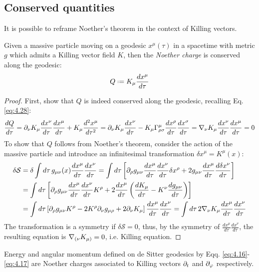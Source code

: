 \subsection{Conserved quantities}

It is possible to reframe Noether's theorem in the context of Killing vectors.

\begin{theorem}[Noether]
  Given a massive particle moving on a geodesic $ x^\mu(\tau) $ in a spacetime with metric $ g $ which admits a Killing vector field $ K $, then the \textit{Noether charge} is conserved along the geodesic:
  \begin{equation}
    Q \defeq K_\mu \frac{dx^\mu}{d\tau}
    \label{eq:4.29}
  \end{equation}
\end{theorem}
\begin{proof}
  First, show that $ Q $ is indeed conserved along the geodesic, recalling Eq. \ref{eq:4.28}:
  \begin{equation*}
    \frac{dQ}{d\tau} = \partial_\nu K_\mu \frac{dx^\nu}{d\tau} \frac{dx^\mu}{d\tau} + K_\mu \frac{d^2 x^\mu}{d\tau^2} = \partial_\nu K_\mu \frac{dx^\nu}{d\tau} - K_\mu \Gamma^\mu_{\rho \sigma} \frac{dx^\rho}{d\tau} \frac{dx^\sigma}{d\tau} = \nabla_\nu K_\mu \frac{dx^\nu}{d\tau} \frac{dx^\mu}{d\tau} = 0
  \end{equation*}
  To show that $ Q $ follows from Noether's theorem, consider the action of the massive particle and introduce an infinitesimal transformation $ \delta x^\mu = K^\mu (x) $:
  \begin{equation*}
    \begin{split}
      \delta \mathcal{S}
      &= \delta \int d\tau\, g_{\mu \nu}(x) \frac{dx^\mu}{d\tau} \frac{dx^\nu}{d\tau} = \int d\tau \left[ \partial_\rho g_{\mu \nu} \frac{dx^\mu}{d\tau} \frac{dx^\nu}{d\tau} \delta x^\rho + 2 g_{\mu \nu} \frac{dx^\mu}{d\tau} \frac{d \delta x^\nu}{d\tau} \right] \\
      &= \int d\tau \left[ \partial_\rho g_{\mu \nu} \frac{dx^\mu}{d\tau} \frac{dx^\nu}{d\tau} K^\rho + 2 \frac{dx^\mu}{d\tau} \left( \frac{dK_\mu}{d\tau} - K^\nu \frac{dg_{\mu \nu}}{d\tau} \right) \right] \\
      &= \int d\tau \left[ \partial_\rho g_{\mu \nu} K^\rho - 2 K^\rho \partial_\nu g_{\mu \rho} + 2 \partial_\nu K_\mu \right] \frac{dx^\mu}{d\tau} \frac{dx^\nu}{d\tau} = \int d\tau\, 2 \nabla_\nu K_\mu \frac{dx^\mu}{d\tau} \frac{dx^\nu}{d\tau}
    \end{split}
  \end{equation*}
  The transformation is a symmetry if $ \delta \mathcal{S} = 0 $, thus, by the symmetry of $ \frac{dx^\mu}{d\tau} \frac{dx^\nu}{d\tau} $, the resulting equation is $ \nabla_{(\nu} K_{\mu)} = 0 $, i.e. Killing equation.
\end{proof}

\begin{example}
  Energy and angular momentum defined on de Sitter geodesics by Eqq. \ref{eq:4.16}-\ref{eq:4.17} are Noether charges associated to Killing vectors $ \partial_t $ and $ \partial_\varphi $ respectively.
\end{example}










